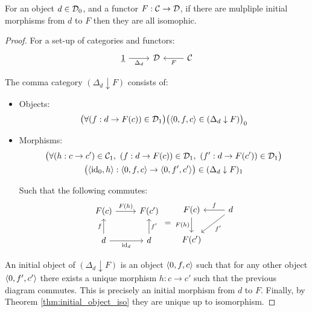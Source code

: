 \begin{theorem}
	For an object $d\in \mathcal{D}_0$, and a functor $F:\mathcal{C}\to \mathcal{D}$, if there are mulpliple
	initial morphisms from $d$ to $F$ then they are all isomophic.

	\begin{proof}
		For a set-up of categories and functors:
		\[\begin{tikzcd}[ampersand replacement=\&]
			{\underline{1}} \& \D \& \C
			\arrow["F", from=1-3, to=1-2]
			\arrow["{\Delta_d}"', from=1-1, to=1-2]
		\end{tikzcd}\]

		The comma category $(\Delta_d\downarrow F)$ consists of:
		\begin{itemize}
			\item Objects:
				\[\big(\forall (f:d\to F(c))\in \mathcal{D}_1\big)
					\big(\langle0,f,c\rangle\in(\Delta_d\downarrow F)\big)_0\]
			\item Morphisms:
				\[
					\begin{gathered}
						\big(\forall (h: c \to c') \in \mathcal{C}_1
							,\ (f: d \to F(c))\in \mathcal{D}_1,\ (f': d\to F(c'))\in \mathcal{D}_1\big)\\
						\big(\langle\mathrm{id}_0, h\rangle: \langle0, f, c\rangle \to \langle0, f', c'\rangle\big)
						\in(\Delta_d\downarrow F)_1
					\end{gathered}
				\]

				Such that the following commutes:
				\[\begin{tikzcd}
					{F(c)} & {F(c')} \\
					d & d
					\arrow["{F(h)}", from=1-1, to=1-2]
					\arrow["{\mathrm{id}_d}"', from=2-1, to=2-2]
					\arrow["f", from=2-1, to=1-1]
					\arrow["{f'}"', from=2-2, to=1-2]
				\end{tikzcd}
				=
				\begin{tikzcd}
					{F(c)} & d \\
					{F(c')}
					\arrow["{F(h)}"', from=1-1, to=2-1]
					\arrow["{f'}", from=1-2, to=2-1]
					\arrow["f"', from=1-2, to=1-1]
				\end{tikzcd}\]
		\end{itemize}
		An initial object of $(\Delta_d\downarrow F)$ is an object $\langle0,f,c\rangle$ such
		that for any other object $\langle0, f', c'\rangle$ there exists a unique morphism
		$h:c \to c'$ such that the previous diagram commutes. This is precisely an
		initial morphism from $d$ to $F$. Finally, by Theorem
		\ref{thm:initial_object_iso} they are unique up to isomorphism.
	\end{proof}
\end{theorem}


